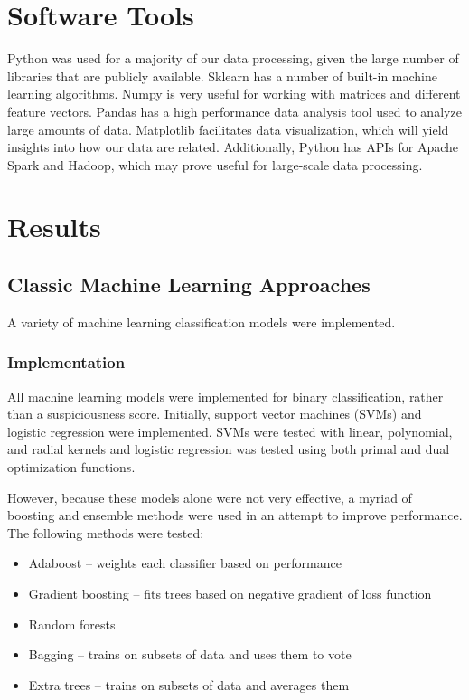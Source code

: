 \documentclass{article} %
\begin{document}
\section{Software Tools}

Python was used for a majority of our data processing, given the large number of libraries that are publicly available.
Sklearn has a number of built-in machine learning algorithms.
Numpy is very useful for working with matrices and different feature vectors.
Pandas has a high performance data analysis tool used to analyze large amounts of data.
Matplotlib facilitates data visualization, which will yield insights into how our data are related.
Additionally, Python has APIs for Apache Spark and Hadoop, which may prove useful for large-scale data processing.

\section{Results}

\subsection{Classic Machine Learning Approaches}

A variety of machine learning classification models were implemented.

\subsubsection{Implementation}

All machine learning models were implemented for binary classification, rather than a suspiciousness score.
Initially, support vector machines (SVMs) and logistic regression were implemented.
SVMs were tested with linear, polynomial, and radial kernels and logistic regression was tested using both primal and dual optimization functions.

However, because these models alone were not very effective, a myriad of boosting and ensemble methods were used in an attempt to improve performance.
The following methods were tested:

\begin{itemize}
\item Adaboost -- weights each classifier based on performance
\item Gradient boosting -- fits trees based on negative gradient of loss function
\item Random forests
\item Bagging -- trains on subsets of data and uses them to vote
\item Extra trees -- trains on subsets of data and averages them
\end{itemize}
\end{document}
